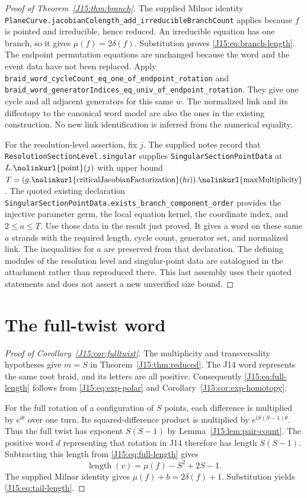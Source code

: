 \documentclass[11pt,oneside]{report}
\theoremstyle{definition}
\numberwithin{equation}{section}
\newcommand{\decl}[1]{\textnormal{\nolinkurl{#1}}}
\newcommand{\length}{\operatorname{length}}
\newcommand{\ii}{\mathrm i}
\begin{document}
\begin{proof}[Proof of Theorem~\ref{J15:thm:branch}]
The supplied Milnor identity
\decl{PlaneCurve.jacobianColength_add_irreducibleBranchCount}
applies because $f$ is pointed and irreducible, hence reduced.
An irreducible equation has one branch, so it gives
$\mu(f)=2\delta(f)$. Substitution proves \eqref{J15:eq:branch-length}.
The endpoint permutation equations are unchanged because the word and
the event data have not been replaced. Apply
\decl{braid_word_cycleCount_eq_one_of_endpoint_rotation} and
\decl{braid_word_generatorIndices_eq_univ_of_endpoint_rotation}.
They give one cycle and all adjacent generators for this same $w$.
The normalized link and its diffeotopy to the canonical word model are
also the ones in the existing construction. No new link identification
is inferred from the numerical equality.

For the resolution-level assertion, fix $j$. The supplied notes record
that \decl{ResolutionSectionLevel.singular} supplies
\decl{SingularSectionPointData} at $L.\decl{point}(j)$ with upper bound
$T=(g.\decl{criticalJacobianFactorization}(hi)).\decl{maxMultiplicity}$.
The quoted existing declaration
\decl{SingularSectionPointData.exists_branch_component_order}
provides the injective parameter germ, the local equation kernel, the
coordinate index, and $2\le a\le T$. Use those data in the result just
proved. It gives a word on these same $a$ strands with the required length,
cycle count, generator set, and normalized link. The inequalities for $a$
are preserved from that declaration. The defining modules of the resolution
level and singular-point data are catalogued in the attachment rather than
reproduced there. This last assembly uses their quoted statements and does
not assert a new unverified size bound.
\end{proof}

\section{The full-twist word}

\begin{proof}[Proof of Corollary~\ref{J15:cor:fulltwist}]
The multiplicity and transversality hypotheses give $m=S$ in
Theorem~\ref{J15:thm:reduced}. The J14 word represents the same root braid,
and its letters are all positive. Consequently \eqref{J15:eq:full-length}
follows from \eqref{J15:eq:exp-polar} and
Corollary~\ref{J15:cor:exp-homotopy}.

For the full rotation of a configuration of $S$ points, each difference
is multiplied by $e^{\ii\theta}$ over one turn. Its squared-difference
product is multiplied by $e^{\ii S(S-1)\theta}$. Thus the full twist
has exponent $S(S-1)$ by Lemma~\ref{J15:lem:pair-count}.
The positive word $d$ representing that rotation in J14 therefore has
length $S(S-1)$. Subtracting this length from \eqref{J15:eq:full-length}
gives
\[
 \length(v)=\mu(f)-S^2+2S-1.
\]
The supplied Milnor identity gives $\mu(f)+b=2\delta(f)+1$.
Substitution yields \eqref{J15:eq:tail-length}.
\end{proof}
\end{document}
